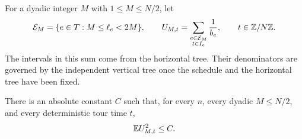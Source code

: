 For a dyadic integer $M$ with $1\leq M\leq N/2$, let
\[
 \mathcal E_M=\{e\in T:M\leq\ell_e<2M\},
 \qquad
 U_{M,t}=\sum_{\substack{e\in\mathcal E_M\\t\in I_e}}\frac1{b_e},
 \qquad t\in\mathbb Z/N\mathbb Z.
\]
The intervals in this sum come from the horizontal tree.  Their
denominators are governed by the independent vertical tree once the
schedule and the horizontal tree have been fixed.

\begin{lemma}
\label{gr:one-scale}
There is an absolute constant $C$ such that, for every $n$, every
dyadic $M\leq N/2$, and every deterministic tour time $t$,
\begin{equation}\label{gr:Ut}
 \mathbb E U_{M,t}^2\leq C.
\end{equation}
\end{lemma}

